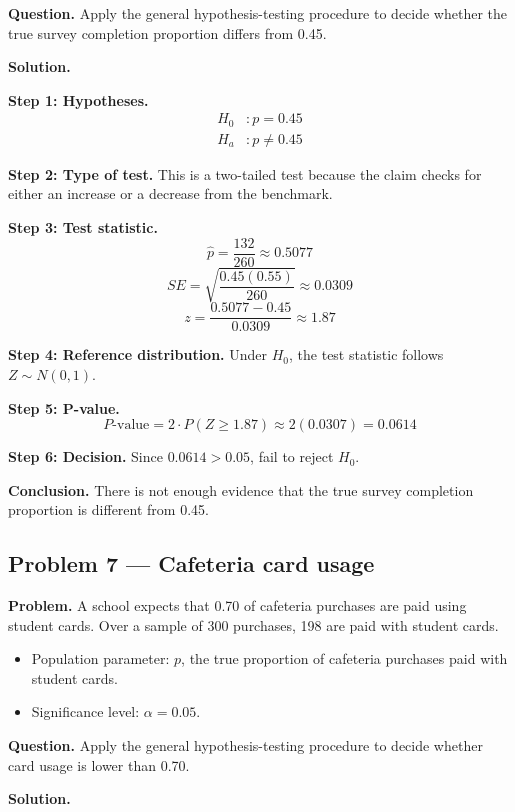 \begin{ExamProblems}
\textbf{Question.} Apply the general hypothesis-testing procedure to decide whether the true survey completion proportion differs from 0.45.

\textbf{Solution.}

\textbf{Step 1: Hypotheses.}
\[
\begin{aligned}
H_0&: p = 0.45 \\
H_a&: p \ne 0.45
\end{aligned}
\]

\textbf{Step 2: Type of test.} This is a two-tailed test because the claim checks for either an increase or a decrease from the benchmark.

\textbf{Step 3: Test statistic.}
\[
\hat{p}=\frac{132}{260}\approx 0.5077
\]
\[
SE=\sqrt{\frac{0.45(0.55)}{260}}\approx 0.0309
\]
\[
z=\frac{0.5077-0.45}{0.0309}\approx 1.87
\]

\textbf{Step 4: Reference distribution.} Under \(H_0\), the test statistic follows \(Z\sim N(0,1)\).

\textbf{Step 5: P-value.}
\[
P\text{-value}=2\cdot P(Z\ge 1.87)\approx 2(0.0307)=0.0614
\]

\textbf{Step 6: Decision.} Since \(0.0614>0.05\), fail to reject \(H_0\).

\textbf{Conclusion.} There is not enough evidence that the true survey completion proportion is different from 0.45.

\hypertarget{c4-ex7}{}
\item
\subsection*{Problem 7 — Cafeteria card usage}

\textbf{Problem.} A school expects that 0.70 of cafeteria purchases are paid using student cards. Over a sample of 300 purchases, 198 are paid with student cards.
\begin{itemize}
    \item Population parameter: \(p\), the true proportion of cafeteria purchases paid with student cards.
    \item Significance level: \(\alpha=0.05\).
\end{itemize}

\textbf{Question.} Apply the general hypothesis-testing procedure to decide whether card usage is lower than 0.70.

\textbf{Solution.}


\end{ExamProblems}
